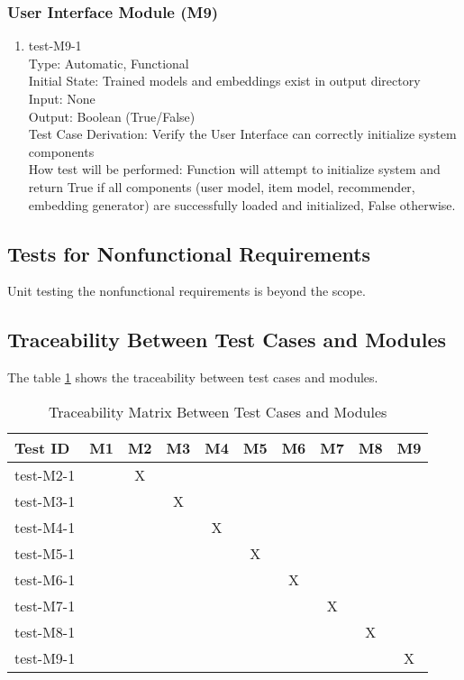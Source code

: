 \documentclass[12pt, titlepage]{article}
\begin{document}
\subsubsection{User Interface Module (M9)}
\begin{enumerate}
  \item test-M9-1\\
  Type: Automatic, Functional\\
  Initial State: Trained models and embeddings exist in output directory\\
  Input: None\\
  Output: Boolean (True/False)\\
  Test Case Derivation: Verify the User Interface can correctly initialize system components\\
  How test will be performed: Function will attempt to initialize system and return True if all components (user model, item model, recommender, embedding generator) are successfully loaded and initialized, False otherwise.
  
\end{enumerate}
\subsection{Tests for Nonfunctional Requirements}

Unit testing the nonfunctional requirements is beyond the scope. 

\subsection{Traceability Between Test Cases and Modules}
The table \ref{Table:Unit} shows the traceability between test cases and modules.


\begin{table}[h!]\label{Table:Unit}
  \centering
  \begin{tabular}{|l|c|c|c|c|c|c|c|c|c|}
  \hline
  \textbf{Test ID} & \textbf{M1} & \textbf{M2} & \textbf{M3} & \textbf{M4} & \textbf{M5} & \textbf{M6} & \textbf{M7} & \textbf{M8} & \textbf{M9} \\
  \hline
  test-M2-1 &   & X &   &   &   &   &   &   &\\
  test-M3-1 &   &   & X &   &   &   &   &   &\\
  test-M4-1 &   &   &   & X &   &   &   &   &\\
  test-M5-1 &   &   &   &   & X &   &   &   &\\
  test-M6-1 &   &   &   &   &   & X &   &   &\\
  test-M7-1 &   &   &   &   &   &  &  X &   &\\
  test-M8-1 &   &   &   &   &   &   &   & X &\\
  test-M9-1 &   &   &   &   &   &   &   &   & X \\
  \hline
  \end{tabular}
  \caption{Traceability Matrix Between Test Cases and Modules}
  \end{table}
\end{document}
